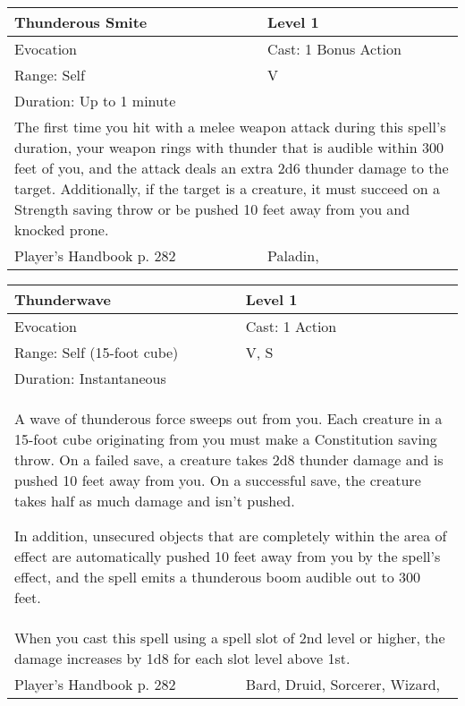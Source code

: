 \documentclass[11pt]{report}
\begin{document}
\begin{table}[H]
	\begin{tabular}{||p{6cm}|p{6cm}||}
		\hline\hline
		\bf{Thunderous Smite} & Level 1\\ \hline
		Evocation & Cast: 1 Bonus Action\\ \hline
		Range: Self & V\\ \hline
		Duration: Up to 1 minute & \\ \hline
		\multicolumn{2}{||p{12cm}||}{The first time you hit with a melee weapon attack during this spell’s duration, your weapon rings with thunder that is audible within 300 feet of you, and the attack deals an extra 2d6 thunder damage to the target. Additionally, if the target is a creature, it must succeed on a Strength saving throw or be pushed 10 feet away from you and knocked prone.}\\ \hline
Player's Handbook p. 282 & Paladin, \\ \hline\hline
	\end{tabular}
\end{table}

\begin{table}[H]
	\begin{tabular}{||p{6cm}|p{6cm}||}
		\hline\hline
		\bf{Thunderwave} & Level 1\\ \hline
		Evocation & Cast: 1 Action\\ \hline
		Range: Self (15-foot cube) & V, S\\ \hline
		Duration: Instantaneous & \\ \hline
		\multicolumn{2}{||p{12cm}||}{A wave of thunderous force sweeps out from you.
Each creature in a 15-foot cube originating from you must make a Constitution saving throw. On a failed save, a creature takes 2d8 thunder damage and is pushed 10 feet away from you. On a successful save, the creature takes half as much damage and isn’t pushed.

In addition, unsecured objects that are completely within the area of effect are automatically pushed 10 feet away from you by the spell’s effect, and the spell emits a thunderous boom audible out to 300 feet.}\\ \hline
		\multicolumn{2}{||p{12cm}||}{When you cast this spell using a spell slot of 2nd level or higher, the damage increases by 1d8 for each slot level above 1st.}\\ \hline
Player's Handbook p. 282 & Bard, Druid, Sorcerer, Wizard, \\ \hline\hline
	\end{tabular}
\end{table}
\end{document}
